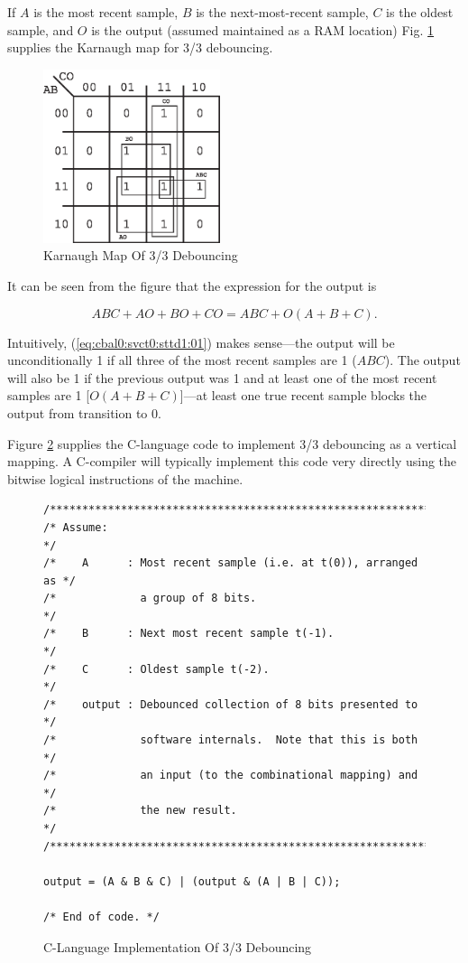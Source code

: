 If $A$ is the most recent sample, $B$ is the next-most-recent sample,
$C$ is the oldest sample, and $O$ is the output (assumed maintained
as a RAM location) Fig. \ref{fig:cbal0:svct0:sttd1:01} 
supplies the Karnaugh map for 3/3
debouncing.

\begin{figure}
\centering
\includegraphics[height=2.0in]{c_bal0/kmap33db.eps}
\caption{Karnaugh Map Of 3/3 Debouncing}
\label{fig:cbal0:svct0:sttd1:01}
\end{figure}

It can be seen from the figure that the expression for the output is

\begin{equation}
\label{eq:cbal0:svct0:sttd1:01}
ABC + AO + BO + CO = ABC + O(A + B + C).
\end{equation}

Intuitively, (\ref{eq:cbal0:svct0:sttd1:01}) makes sense---the output 
will be unconditionally 1 if all three of the most recent samples are 1
($ABC$).  The output will also be 1 if the previous output was 1
and at least one of the most recent samples are 1 [$O(A+B+C)$]---at least
one true recent sample blocks the output from transition to 0.

Figure \ref{fig:cbal0:svct0:sttd1:02} supplies the C-language
code to implement 3/3 debouncing as a vertical mapping.
A C-compiler will typically implement this code very directly
using the bitwise logical instructions of the machine.

\begin{figure}
\begin{verbatim}
/**************************************************************/
/* Assume:                                                    */
/*    A      : Most recent sample (i.e. at t(0)), arranged as */
/*             a group of 8 bits.                             */
/*    B      : Next most recent sample t(-1).                 */
/*    C      : Oldest sample t(-2).                           */
/*    output : Debounced collection of 8 bits presented to    */
/*             software internals.  Note that this is both    */
/*             an input (to the combinational mapping) and    */
/*             the new result.                                */
/**************************************************************/

output = (A & B & C) | (output & (A | B | C));

/* End of code. */
\end{verbatim}
\caption{C-Language Implementation Of 3/3 Debouncing}
\label{fig:cbal0:svct0:sttd1:02}
\end{figure}

